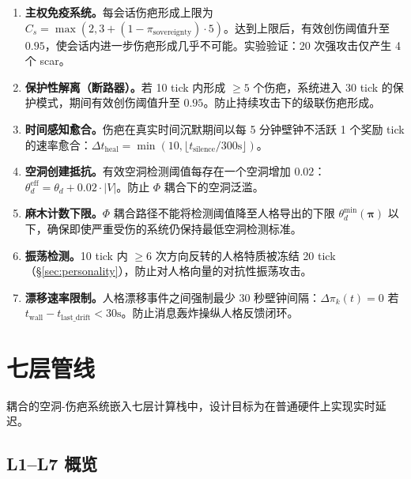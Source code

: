 \documentclass[11pt]{article}
\begin{document}
\begin{enumerate}[leftmargin=*]
\item \textbf{主权免疫系统。}每会话伤疤形成上限为 $C_s = \max(2, 3 + (1 - \pi_{\text{sovereignty}}) \cdot 5)$。达到上限后，有效创伤阈值升至 $0.95$，使会话内进一步伤疤形成几乎不可能。实验验证：20 次强攻击仅产生 4 个 scar。

\item \textbf{保护性解离（断路器）。}若 10 tick 内形成 $\geq 5$ 个伤疤，系统进入 30 tick 的保护模式，期间有效创伤阈值升至 $0.95$。防止持续攻击下的级联伤疤形成。

\item \textbf{时间感知愈合。}伤疤在真实时间沉默期间以每 5 分钟壁钟不活跃 1 个奖励 tick 的速率愈合：$\Delta t_{\text{heal}} = \min(10, \lfloor t_{\text{silence}} / 300\text{s} \rfloor)$。

\item \textbf{空洞创建抵抗。}有效空洞检测阈值每存在一个空洞增加 $0.02$：$\theta_d^{\text{eff}} = \theta_d + 0.02 \cdot |V|$。防止 $\Phi$ 耦合下的空洞泛滥。

\item \textbf{麻木计数下限。}$\Phi$ 耦合路径不能将检测阈值降至人格导出的下限 $\theta_d^{\min}(\boldsymbol{\pi})$ 以下，确保即使严重受伤的系统仍保持最低空洞检测标准。

\item \textbf{振荡检测。}10 tick 内 $\geq 6$ 次方向反转的人格特质被冻结 20 tick（\S\ref{sec:personality}），防止对人格向量的对抗性振荡攻击。

\item \textbf{漂移速率限制。}人格漂移事件之间强制最少 30 秒壁钟间隔：$\Delta\pi_k(t) = 0$ 若 $t_{\text{wall}} - t_{\text{last\_drift}} < 30\text{s}$。防止消息轰炸操纵人格反馈闭环。
\end{enumerate}

\section{七层管线}
\label{sec:pipeline}

耦合的空洞-伤疤系统嵌入七层计算栈中，设计目标为在普通硬件上实现实时延迟。

\subsection{L1--L7 概览}
\end{document}
